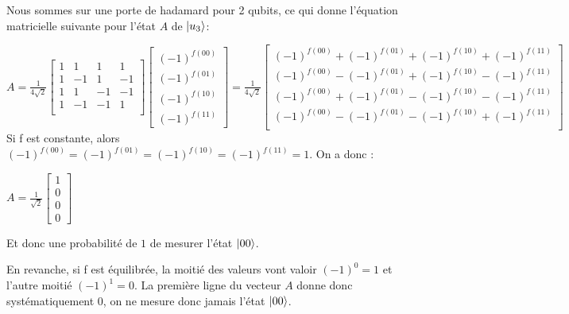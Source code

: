 \documentclass[12pt,a4paper]{article}
\DeclarePairedDelimiter\ket{\lvert}{\rangle}
\begin{document}
Nous sommes sur une porte de hadamard pour 2 qubits, ce qui donne l'équation matricielle suivante pour l'état $A$ de $\ket{u_3}$:

$
A=
\frac{1}{4\sqrt{2}} 
\begin{bmatrix}
  1 & 1 & 1 & 1 \\
  1 & -1 & 1 & -1 \\
  1 & 1 & -1 & -1 \\
  1 & -1 & -1 & 1 \\
\end{bmatrix}
\begin{bmatrix}
  (-1)^{f(00)} \\ (-1)^{f(01)} \\ (-1)^{f(10)} \\ (-1)^{f(11)}
\end{bmatrix}=
\frac{1}{4\sqrt{2}} 
\begin{bmatrix}
  (-1)^{f(00)} + (-1)^{f(01)} + (-1)^{f(10)} + (-1)^{f(11)} \\
  (-1)^{f(00)} - (-1)^{f(01)} + (-1)^{f(10)} - (-1)^{f(11)} \\
  (-1)^{f(00)} + (-1)^{f(01)} - (-1)^{f(10)} - (-1)^{f(11)} \\
  (-1)^{f(00)} - (-1)^{f(01)} - (-1)^{f(10)} + (-1)^{f(11)} \\
\end{bmatrix}
$
\medbreak
Si f est constante, alors $(-1)^{f(00)} = (-1)^{f(01)} = (-1)^{f(10)} = (-1)^{f(11)} = 1$. On a donc : 

$
A=
\frac{1}{\sqrt{2}} 
\begin{bmatrix}
  1 \\ 0 \\ 0 \\ 0
\end{bmatrix}
$

Et donc une probabilité de $1$ de mesurer l'état $\ket{00}$.

\medbreak
En revanche, si f est équilibrée, la moitié des valeurs vont valoir $(-1)^{0} = 1$ et l'autre moitié $(-1)^{1} = 0$. La première ligne du vecteur $A$ donne donc systématiquement 0, on ne mesure donc jamais l'état $\ket{00}$.

\medbreak
\end{document}
